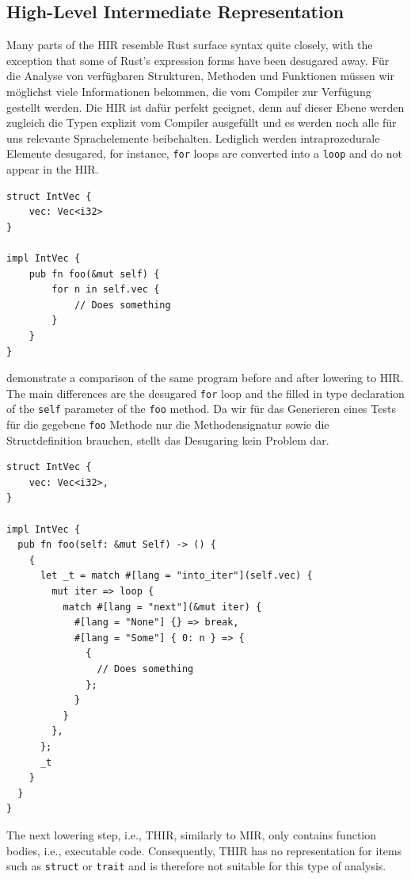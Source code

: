 \documentclass[paper=a4,%
  twoside,%
  BCOR4mm,%
  abstract=true,%
  toc=bibliography,%
  chapterprefix=true,%
  toc=bibliographynumbered,%
  open=right,%
  english,%
  pagesize=pdftex]{scrreprt}
\newcommand{\hir}{\ac{HIR}\xspace}
\newcommand{\mir}{\ac{MIR}\xspace}
\begin{document}
\subsection{High-Level Intermediate Representation}
Many parts of the \hir resemble Rust surface syntax quite closely, with the exception that some of Rust's expression forms have been desugared away. Für die Analyse von verfügbaren Strukturen, Methoden und Funktionen müssen wir möglichst viele Informationen bekommen, die vom Compiler zur Verfügung gestellt werden. Die \hir ist dafür perfekt geeignet, denn auf dieser Ebene werden zugleich die Typen explizit vom Compiler ausgefüllt und es werden noch alle für uns relevante Sprachelemente beibehalten. Lediglich werden intraprozedurale Elemente desugared, for instance, \texttt{for} loops are converted into a \texttt{loop} and do not appear in the \hir.
\begin{lstlisting}[style=boxed, caption={An example Rust program that we convert to HIR}, label=lst:hir-lowering]
struct IntVec {
    vec: Vec<i32>
}

impl IntVec {
    pub fn foo(&mut self) {
        for n in self.vec {
            // Does something
        }
    }
}
\end{lstlisting}

 demonstrate a comparison of the same program before and after lowering to \hir. The main differences are the desugared \texttt{for} loop and the filled in type declaration of the \texttt{self} parameter of the \texttt{foo} method. Da wir für das Generieren eines Tests für die gegebene \texttt{foo} Methode nur die Methodensignatur sowie die Structdefinition brauchen, stellt das Desugaring kein Problem dar.

\begin{lstlisting}[style=boxed, caption={HIR of the code in \Cref{lst:hir-lowering}}, label=lst:hir-lowered]
struct IntVec {
    vec: Vec<i32>,
}

impl IntVec {
  pub fn foo(self: &mut Self) -> () {
    {
      let _t = match #[lang = "into_iter"](self.vec) {
        mut iter => loop {
          match #[lang = "next"](&mut iter) {
            #[lang = "None"] {} => break,
            #[lang = "Some"] { 0: n } => {
              {
                // Does something
              };
            }
          }
        },
      };
      _t
    }
  }
}
\end{lstlisting}

The next lowering step, i.e., \ac{THIR}, similarly to \mir, only contains function bodies, i.e., executable code. Consequently, \ac{THIR} has no representation for items such as \texttt{struct} or \texttt{trait} and is therefore not suitable for this type of analysis.
\end{document}
